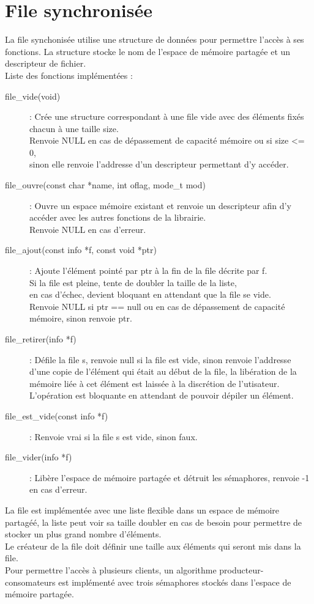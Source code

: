 \documentclass[12pt]{article}
\begin{document}
\section{File synchronisée}
    La file synchonisée utilise une structure de données pour permettre l'accès à ses fonctions.
    La structure stocke le nom de l'espace de mémoire partagée et un descripteur de fichier.\\
    Liste des fonctions implémentées :
    \begin{description}
        \item [file\_vide(void)] : Crée une structure correspondant à une file vide avec des éléments
        fixés chacun à une taille size.\\
        Renvoie NULL en cas de dépassement de capacité mémoire ou si size <= 0,\\
        sinon elle renvoie l'addresse d'un descripteur permettant d'y accéder.

        \item [file\_ouvre(const char *name, int oflag, mode\_t mod)] : Ouvre un espace mémoire existant et renvoie un descripteur afin d'y accéder avec les autres fonctions de la librairie.\\
        Renvoie NULL en cas d'erreur.

        \item [file\_ajout(const info *f, const void *ptr)] :
        Ajoute l'élément pointé par ptr à la fin de la file décrite par f.\\
        Si la file est pleine, tente de doubler la taille de la liste,\\
        en cas d'échec, devient bloquant en attendant que la file se vide.\\
        Renvoie NULL si ptr == null ou en cas de dépassement de capacité mémoire, sinon renvoie ptr.

        \item [file\_retirer(info *f)] : Défile la file s, renvoie null si la file est vide, sinon renvoie l'addresse d'une copie de l'élément qui était au début de la file, la libération de la mémoire liée à cet élément est laissée à la discrétion de l'utisateur.\\
        L'opération est bloquante en attendant de pouvoir dépiler un élément.

        \item [file\_est\_vide(const info *f)] : Renvoie vrai si la file s est vide, sinon faux.

        \item [file\_vider(info *f)] : Libère l'espace de mémoire partagée et détruit les sémaphores, renvoie -1 en cas d'erreur.
    \end{description}
    La file est implémentée avec une liste flexible dans un espace de mémoire partagéé, la liste peut voir sa taille doubler en cas de besoin pour permettre de stocker un plus grand nombre d'éléments. \\
    Le créateur de la file doit définir une taille aux éléments qui seront mis dans la file.\\
    Pour permettre l'accès à plusieurs clients, un algorithme producteur-consomateurs est implémenté avec trois sémaphores stockés dans l'espace de mémoire partagée.
\end{document}
